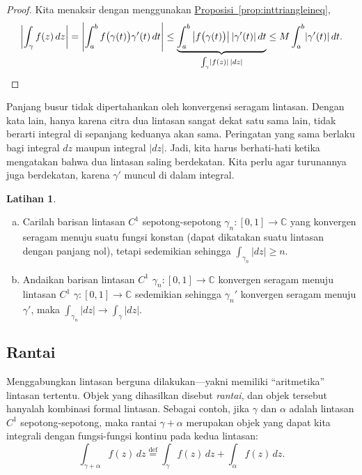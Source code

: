 \documentclass[12pt,openany]{book}
\newcommand{\sabs}[1]{\lvert {#1} \rvert}
\newcommand{\abs}[1]{\left\lvert {#1} \right\rvert}
\newcommand{\C}{{\mathbb{C}}}
\newcommand{\myquote}[1]{``#1''}
\theoremstyle{plain}
\theoremstyle{remark}
\theoremstyle{definition}
\newenvironment{exbox}{%
    \def\FrameCommand{\vrule width 1pt \relax\hspace{10pt}}%
    \MakeFramed{\advance\hsize-\width\FrameRestore}%
}{%
    \endMakeFramed
}
\newenvironment{exparts}{%
    \leavevmode\begin{enumerate}[a),noitemsep,topsep=0pt,parsep=0pt,partopsep=0pt]
}{%
    \end{enumerate}
}
\theoremstyle{exercise}
\newtheorem{exercise}{Latihan}[section]
\theoremstyle{example}
\newcommand{\propref}[1]{\hyperref[#1]{Proposisi~\ref*{#1}}}
\begin{document}
\begin{proof}
Kita menaksir dengan menggunakan \propref{prop:inttriangleineq},
\begin{equation*}
\abs{\int_\gamma f(z) \, dz}
=
\abs{\int_a^b f\bigl( \gamma(t) \bigr) \gamma'(t) \, dt}
\leq
\underbrace{\int_a^b \abs{ f\bigl( \gamma(t) \bigr) }  \sabs{ \gamma'(t) }
\, dt}_{\int_\gamma \sabs{f(z)} \, \sabs{dz}}
\leq
M
\int_a^b \sabs{ \gamma'(t) } \, dt .
\qedhere
\end{equation*}
\end{proof}

Panjang busur tidak dipertahankan oleh konvergensi seragam lintasan.
Dengan kata lain, hanya karena citra dua lintasan sangat dekat satu sama
lain, tidak berarti integral di sepanjang keduanya akan sama.
Peringatan yang sama berlaku bagi integral $dz$ maupun integral $\sabs{dz}$.
Jadi, kita harus berhati-hati ketika mengatakan bahwa dua lintasan saling berdekatan.
Kita perlu agar turunannya juga berdekatan, karena $\gamma'$ muncul
di dalam integral.

\begin{exbox}
\begin{exercise}
\begin{exparts}
\item
Carilah barisan lintasan $C^1$ sepotong-sepotong $\gamma_n \colon [0,1] \to \C$
yang konvergen seragam menuju suatu fungsi konstan (dapat dikatakan suatu lintasan dengan
panjang nol), tetapi sedemikian sehingga $\int_{\gamma_n} \sabs{dz} \geq n$.
\item
Andaikan barisan lintasan $C^1$ $\gamma_n \colon [0,1] \to \C$
konvergen seragam menuju lintasan $C^1$ $\gamma \colon [0,1] \to \C$
sedemikian sehingga $\gamma_n'$ konvergen seragam menuju $\gamma'$, maka
$\int_{\gamma_n} \sabs{dz} \to
\int_{\gamma} \sabs{dz}$.
\end{exparts}
\end{exercise}
\end{exbox}

\subsection{Rantai}

Menggabungkan lintasan berguna dilakukan---yakni memiliki \myquote{aritmetika} lintasan tertentu.
Objek yang dihasilkan disebut \emph{rantai}, dan objek tersebut
hanyalah kombinasi formal lintasan.  Sebagai contoh, jika $\gamma$
dan $\alpha$ adalah lintasan $C^1$ sepotong-sepotong, maka rantai $\gamma+\alpha$
merupakan objek yang dapat kita integrali dengan fungsi-fungsi kontinu
pada kedua lintasan:
\begin{equation*}
\int_{\gamma + \alpha} f(z) \, dz
\overset{\text{def}}{=}
\int_{\gamma} f(z) \, dz +
\int_{\alpha} f(z) \, dz .
\end{equation*}
\end{document}
